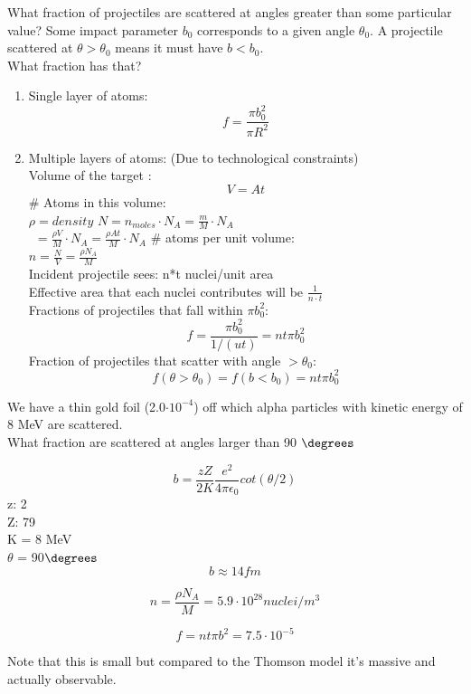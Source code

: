 \documentclass[class=article,crop=false]{standalone}
\begin{document}
What fraction of projectiles are scattered at angles greater than some particular value?
Some impact parameter $b_0$ corresponds to a given angle $\theta_0$. A projectile scattered at $\theta > \theta_0$ means it must have $b<b_0$. \\
What fraction has that? \\
\begin{enumerate}
	\item Single layer of atoms:\\
		$$  f = \frac{\pi b_0^2}{\pi R^2} $$
	\item Multiple layers of atoms: (Due to technological constraints)\\
		Volume of the target :\\
		$$ V = At $$
		\# Atoms in this volume:\\
		$ \rho = density $
		$ N = n_{moles} \cdot N_A = \frac{m}{M} \cdot N_A $ \\
		$\ \ = \frac{\rho V}{M} \cdot N_A = \frac{\rho At}{M} \cdot N_A$
		\# atoms per unit volume: \\
		$n = \frac{N}{V} = \frac{\rho N_A}{M}$\\
		Incident projectile sees: n*t nuclei/unit area \\
		Effective area that each nuclei contributes will be $\frac{1}{n\cdot t}$\\
		Fractions of projectiles that fall within $\pi b_0^2$:
		$$ f = \frac{\pi b_0^2}{1/(ut)} = nt\pi b_0^2 $$
		Fraction of projectiles that scatter with angle $> \theta_0$:
		$$ f(\theta > \theta_0) = f(b < b_0) = nt\pi b_0^2 $$
\end{enumerate}


\begin{question}[Example]
	We have a thin gold foil (2.0$\cdot 10^{-4}$) off which alpha particles with kinetic energy of 8 MeV are scattered. \\
	What fraction are scattered at angles larger than 90 $\degrees$
	\begin{answer}
		$$ b = \frac{zZ}{2K} \frac{e^2}{4\pi\epsilon_0} cot(\theta/2) $$
		z: 2\\
		Z: 79\\
		K = 8 MeV\\
		$\theta$ = 90$\degrees$\\
		$$ b \approx 14 fm $$
	\end{answer}
	\begin{answer}
		$$ n = \frac{\rho N_A}{M} = 5.9 \cdot 10^{28} nuclei/m^3 $$
	\end{answer}
	\begin{answer}
		$$ f = nt\pi b^2 = 7.5 \cdot 10^{-5} $$
	\end{answer}
	Note that this is small but compared to the Thomson model it's massive and actually observable.
\end{question}
\end{document}
